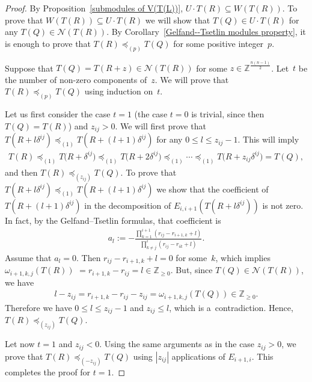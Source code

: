 \documentclass[11pt]{article}
\numberwithin{equation}{section}
\begin{document}
\begin{proof}
By Proposition~\ref{submodules of V(T(L))}, $U\cdot T(R)\subseteq W(T(R))$.
To prove that $ W(T(R))\subseteq U\cdot T(R)$ we will show that $T(Q)\in U\cdot T(R)$ for any
$T(Q)\in\mathcal{N}(T(R))$.
By Corollary~\ref{Gelfand--Tsetlin modules property}, it is enough to prove that $T(R)\preceq_{(p)} T(Q)$ for some
positive integer~$p$.

Suppose that $T(Q)=T(R+z)\in \mathcal{N}(T(R))$ for some $z\in\mathbb{\mathbb{Z}}^{\frac{n(n-1)}{2}}$.
Let~$t$ be the number of non-zero components of~$z$.
We will prove that $T(R)\preceq_{(p)} T(Q)$ using induction on~$t$.

Let us f\/irst consider the case $t=1$ (the case $t=0$ is trivial, since then $T(Q)=T(R)$) and $z_{ij}>0$.
We will f\/irst prove that $T(R+l\delta^{ij})\preceq_{(1)}T(R+(l+1)\delta^{ij})$ for any $0\leq l \leq z_{ij}-1$.
This will imply
\begin{gather*}
T(R)\preceq_{(1)}T\big(R+\delta^{ij}\big)\preceq_{(1)}T\big(R+2\delta^{ij}\big)\preceq_{(1)}\cdots\preceq_{(1)}T\big(R+z_{ij}\delta^{ij}\big)=T(Q),
\end{gather*}
and then $T(R)\preceq_{(z_{ij})}T(Q)$.
To prove that $T(R+l\delta^{ij})\preceq_{(1)}T(R+(l+1)\delta^{ij})$ we show that the coef\/f\/icient of
$T(R+(l+1)\delta^{ij})$ in the decomposition of $E_{i,i+1}(T(R+l\delta^{ij}))$ is not zero.
In fact, by the Gelfand--Tsetlin formulas, that coef\/f\/icient is
\begin{gather*}
a_{l}:=-\frac{\prod\limits_{k=1}^{i+1}(r_{ij}-r_{i+1,k}+l)}{\prod\limits_{k\neq j}^{i}(r_{ij}-r_{ik}+l)}.
\end{gather*}
Assume that $a_{l}=0$.
Then $r_{ij}-r_{i+1,k}+l=0$ for some~$k$, which implies $\omega_{i+1,k,j}(T(R))$ $=r_{i+1,k}-r_{ij}=l\in\mathbb{Z}_{\geq
0}$.
But, since $T(Q)\in\mathcal{N}(T(R))$, we have{\samepage
\begin{gather*}
l-z_{ij}=r_{i+1,k}-r_{ij}-z_{ij}=\omega_{i+1,k,j}(T(Q))\in\mathbb{Z}_{\geq{0}}.
\end{gather*}
Therefore we have %
$ 0\leq l \leq z_{ij}-1$ and $z_{ij}\leq l$, which is a~contradiction.
Hence,
$T(R)\preceq_{(z_{ij})}T(Q)$.}

Let now $t=1$ and $z_{ij}<0$.
Using the same arguments as in the case $z_{ij}>0$, we prove that $T(R)\preceq_{(-z_{ij})}T(Q)$ using $|z_{ij}|$
applications of $E_{i+1,i}$.
This completes the proof for $t=1$.


\end{proof}
\end{document}
